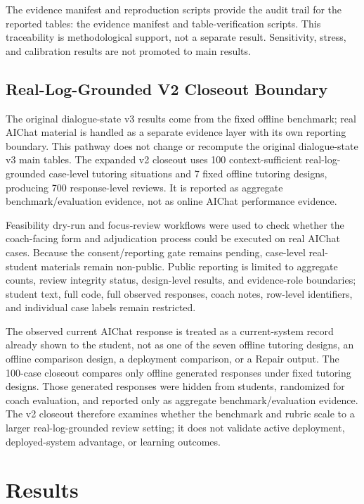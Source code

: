\documentclass[11pt]{article}
\begin{document}
The evidence manifest and reproduction scripts provide the audit trail for the reported tables: the evidence manifest and table-verification scripts. This traceability is methodological support, not a separate result. Sensitivity, stress, and calibration results are not promoted to main results.

\subsection{Real-Log-Grounded V2 Closeout Boundary}

The original dialogue-state v3 results come from the fixed offline benchmark; real AIChat material is handled as a separate evidence layer with its own reporting boundary. This pathway does not change or recompute the original dialogue-state v3 main tables. The expanded v2 closeout uses 100 context-sufficient real-log-grounded case-level tutoring situations and 7 fixed offline tutoring designs, producing 700 response-level reviews. It is reported as aggregate benchmark/evaluation evidence, not as online AIChat performance evidence.

Feasibility dry-run and focus-review workflows were used to check whether the coach-facing form and adjudication process could be executed on real AIChat cases. Because the consent/reporting gate remains pending, case-level real-student materials remain non-public. Public reporting is limited to aggregate counts, review integrity status, design-level results, and evidence-role boundaries; student text, full code, full observed responses, coach notes, row-level identifiers, and individual case labels remain restricted.

The observed current AIChat response is treated as a current-system record already shown to the student, not as one of the seven offline tutoring designs, an offline comparison design, a deployment comparison, or a Repair output. The 100-case closeout compares only offline generated responses under fixed tutoring designs. Those generated responses were hidden from students, randomized for coach evaluation, and reported only as aggregate benchmark/evaluation evidence. The v2 closeout therefore examines whether the benchmark and rubric scale to a larger real-log-grounded review setting; it does not validate active deployment, deployed-system advantage, or learning outcomes.

\section{Results}
\end{document}
